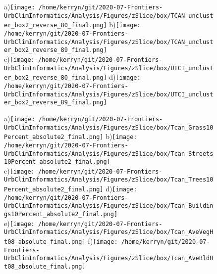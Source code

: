 \documentclass{article}
\begin{document}
%
%
\begin{figure}
\centering 
{\tiny a)}\texttt{[image: /home/kerryn/git/2020-07-Frontiers-UrbClimInformatics/Analysis/Figures/zSlice/box/TCAN\_uncluster\_box2\_reverse\_80\_final.png]}   
{\tiny b)}\texttt{[image: /home/kerryn/git/2020-07-Frontiers-UrbClimInformatics/Analysis/Figures/zSlice/box/TCAN\_uncluster\_box2\_reverse\_89\_final.png]}
\\
{\tiny c)}\texttt{[image: /home/kerryn/git/2020-07-Frontiers-UrbClimInformatics/Analysis/Figures/zSlice/box/UTCI\_uncluster\_box2\_reverse\_80\_final.png]}   
{\tiny d)}\texttt{[image: /home/kerryn/git/2020-07-Frontiers-UrbClimInformatics/Analysis/Figures/zSlice/box/UTCI\_uncluster\_box2\_reverse\_89\_final.png]}
\end{figure} 
\clearpage















\begin{figure}
\centering    
{\tiny a)}\texttt{[image: /home/kerryn/git/2020-07-Frontiers-UrbClimInformatics/Analysis/Figures/zSlice/box/Tcan\_Grass10Percent\_absolute2\_final.png]}
{\tiny b)}\texttt{[image: /home/kerryn/git/2020-07-Frontiers-UrbClimInformatics/Analysis/Figures/zSlice/box/Tcan\_Streets10Percent\_absolute2\_final.png]}\\
{\tiny c)}\texttt{[image: /home/kerryn/git/2020-07-Frontiers-UrbClimInformatics/Analysis/Figures/zSlice/box/Tcan\_Trees10Percent\_absolute2\_final.png]}
{\tiny d)}\texttt{[image: /home/kerryn/git/2020-07-Frontiers-UrbClimInformatics/Analysis/Figures/zSlice/box/Tcan\_Buildings10Percent\_absolute2\_final.png]}\\
{\tiny e)}\texttt{[image: /home/kerryn/git/2020-07-Frontiers-UrbClimInformatics/Analysis/Figures/zSlice/box/Tcan\_AveVegHt08\_absolute\_final.png]}
{\tiny f)}\texttt{[image: /home/kerryn/git/2020-07-Frontiers-UrbClimInformatics/Analysis/Figures/zSlice/box/Tcan\_AveBldHt08\_absolute\_final.png]}
\end{figure} 
\clearpage
\end{document}

